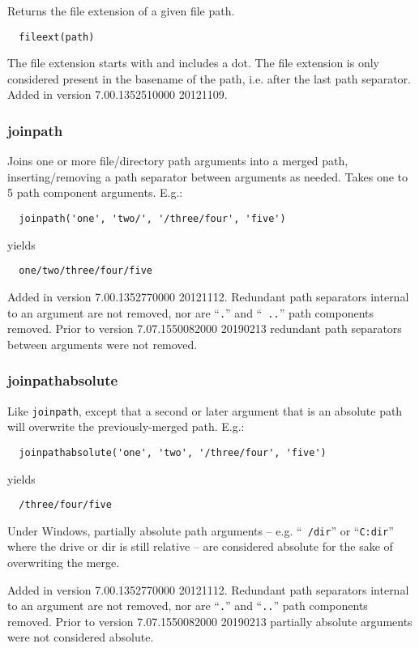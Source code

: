   Returns the file extension of a given file path.

\begin{verbatim}
  fileext(path)
\end{verbatim}

  The file extension starts with and includes a dot.  The file extension
is only considered present in the basename of the path, i.e. after the
last path separator.  Added in version 7.00.1352510000 20121109.

\subsubsection{joinpath}

Joins one or more file/directory path arguments into a merged path,
inserting/removing a path separator between arguments as needed.
Takes one to 5 path component arguments.  E.g.:

\begin{verbatim}
  joinpath('one', 'two/', '/three/four', 'five')
\end{verbatim}

yields

\begin{verbatim}
  one/two/three/four/five
\end{verbatim}

Added in version 7.00.1352770000 20121112.  Redundant path separators
internal to an argument are not removed, nor are ``{\tt .}'' and ``{\tt
  ..}'' path components removed.  Prior to version 7.07.1550082000
20190213 redundant path separators between arguments were not
removed.

\subsubsection{joinpathabsolute}

Like \verb`joinpath`, except that a second or later argument that is
an absolute path will overwrite the previously-merged path.  E.g.:

\begin{verbatim}
  joinpathabsolute('one', 'two', '/three/four', 'five')
\end{verbatim}

yields

\begin{verbatim}
  /three/four/five
\end{verbatim}

Under Windows, partially absolute path arguments -- e.g. ``{\tt
  /dir}'' or ``{\tt C:dir}'' where the drive or dir is still relative
-- are considered absolute for the sake of overwriting the merge.

Added in version 7.00.1352770000 20121112.  Redundant path separators
internal to an argument are not removed, nor are ``{\tt .}'' and
``{\tt ..}'' path components removed.  Prior to version
7.07.1550082000 20190213 partially absolute arguments were not
considered absolute.

